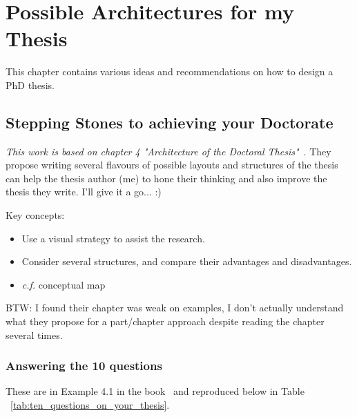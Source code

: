 \chapter{Possible Architectures for my Thesis}
This chapter contains various ideas and recommendations on how to design a PhD thesis. 

\section{Stepping Stones to achieving your Doctorate}
\emph{This work is based on chapter 4 "Architecture of the Doctoral Thesis"}~\cite{trafford2008stepping}. They propose writing several flavours of possible layouts and structures of the thesis can help the thesis author (me) to hone their thinking and also improve the thesis they write. I'll give it a go... :)

Key concepts:
\begin{itemize}
    \item Use a visual strategy to assist the research.
    \item Consider several structures, and compare their advantages and disadvantages.
    \item \emph{c.f.} conceptual map
\end{itemize}

BTW: I found their chapter was weak on examples, I don't actually understand what they propose for a part/chapter approach despite reading the chapter several times.

\subsection{Answering the 10 questions}
These are in Example 4.1 in the book~\cite{trafford2008stepping} and reproduced below in Table ~\ref{tab:ten_questions_on_your_thesis}.


